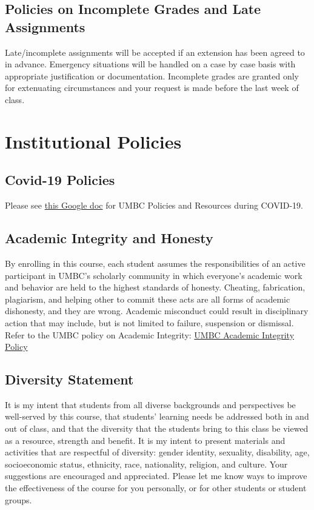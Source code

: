 \documentclass[11pt]{article}
\begin{document}
\subsection*{Policies on Incomplete Grades and Late Assignments}
Late/incomplete assignments will be accepted if an extension has been agreed to in advance. Emergency situations will be handled on a case by case basis with appropriate justification or documentation.
\newline 
Incomplete grades are granted only for extenuating circumstances and your request is made before the last week of class.

\section*{Institutional Policies}

\subsection*{Covid-19 Policies}
Please see \href{https://docs.google.com/document/d/1xWWGAR8qEzKYr7qaVHoEhvO6lyXIyn6M3M7EFZPJQgA/edit?usp=sharing}{this Google doc} for UMBC Policies and Resources during COVID-19. 

\subsection*{Academic Integrity and Honesty}

By enrolling in this course, each student assumes the responsibilities of an active participant in UMBC’s scholarly community in which everyone's academic work and behavior are held to the highest standards of honesty.  Cheating, fabrication, plagiarism, and helping other to commit these acts are all forms of academic dishonesty, and they are wrong.  Academic misconduct could result in disciplinary action that may include, but is not limited to failure, suspension or dismissal.  
\newline
Refer to the UMBC policy on Academic Integrity: \href{https://catalog.umbc.edu/content.php?catoid=17&navoid=879#academic-integrity}{UMBC Academic Integrity Policy}


\subsection*{Diversity Statement}
It is my intent that students from all diverse backgrounds and perspectives be well-served by this course, that students' learning needs be addressed both in and out of class, and that the diversity that the students bring to this class be viewed as a resource, strength and benefit. It is my intent to present materials and activities that are respectful of diversity: gender identity, sexuality, disability, age, socioeconomic status, ethnicity, race, nationality, religion, and culture. Your suggestions are encouraged and appreciated. Please let me know ways to improve the effectiveness of the course for you personally, or for other students or student groups.
\end{document}
